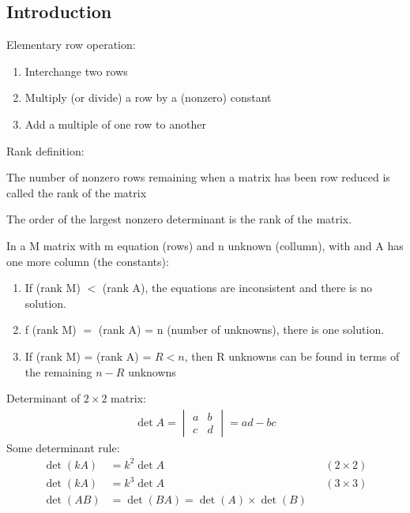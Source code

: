 \documentclass[../main.tex]{subfiles}
\begin{document}
\subsection*{Introduction}
Elementary row operation:
\begin{enumerate}
    \item Interchange two rows 
    \item Multiply (or divide) a row by a (nonzero) constant 
    \item Add a multiple of one row to another
\end{enumerate}

Rank definition:
\begin{definition}[Rank]
    The number of nonzero rows remaining when a matrix has been row reduced is called the rank of the matrix
\end{definition}
\begin{definition}[Rank]
    The order of the largest nonzero determinant is the rank of the matrix. 
\end{definition}

In a M matrix with m equation (rows) and n unknown (collumn), with and A has one more column (the constants):
\begin{enumerate}
    \item If (rank M) $<$ (rank A), the equations are inconsistent and there is no solution.
    \item f (rank M) $=$ (rank A) = n (number of unknowns), there is one solution.
    \item If (rank M) = (rank A) = $R < n$, then R unknowns can be found in terms of the remaining $n-R$ unknowns
\end{enumerate}

Determinant of $2\times 2$ matrix:
\begin{align*}
    \det A=\begin{vmatrix}
        a&b\\
        c&d
    \end{vmatrix}=ad-bc
\end{align*}
Some determinant rule:
\begin{align*}
    \det(kA)&=k^2\det A &&(2\times2)\\
    \det(kA)&=k^3\det A &&(3\times3)\\
    \det(AB)&=\det(BA)=\det(A)\times\det (B)
\end{align*}
\end{document}

